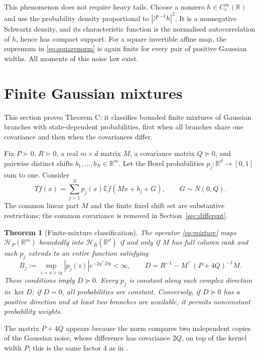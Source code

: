 \documentclass[11pt,a4paper]{article}
\newtheorem{theorem}{Theorem}[section]
\theoremstyle{remark}
\newcommand{\R}{\mathbb R}
\newcommand{\E}{\mathbb E}
\newcommand{\HH}{\mathcal H}
\begin{document}
This phenomenon does not require heavy tails. Choose a nonzero
$h\in C_c^\infty(\R)$ and use the probability density proportional to
$|\mathcal F^{-1}h|^2$. It is a nonnegative Schwartz density, and its
characteristic function is the normalised autocorrelation of $h$, hence
has compact support. For a square invertible affine map, the supremum
in \eqref{eq:squarenorm} is again finite for every pair of positive
Gaussian widths. All moments of this noise law exist.

\section{Finite Gaussian mixtures}\label{sec:mixtures}

This section proves Theorem C: it classifies bounded finite mixtures of
Gaussian branches with state-dependent probabilities, first when all
branches share one covariance and then when the covariances differ.

Fix $P\succ0$, $R\succ0$, a real $m\times d$ matrix $M$,
a covariance matrix $Q\succeq0$, and pairwise distinct shifts
$b_1,\ldots,b_N\in\R^m$. Let the Borel probabilities
$p_j:\R^d\to[0,1]$ sum to one. Consider
\begin{equation}\label{eq:mixture}
 Tf(x)=\sum_{j=1}^Np_j(x)\E f(Mx+b_j+G),\qquad
                         G\sim N(0,Q).
\end{equation}
The common linear part $M$ and the finite fixed shift set are
substantive restrictions; the common covariance is removed in
Section~\ref{sec:different}.

\begin{theorem}[Finite-mixture classification]\label{thm:mixture}
The operator \eqref{eq:mixture} maps $\HH_P(\R^m)$ boundedly
into $\HH_R(\R^d)$ if and only if $M$ has full column rank and
each $p_j$ extends to an entire function satisfying
\begin{equation}\label{eq:weightbound}
 B_j:=\sup_{z=x+iy}|p_j(z)|e^{-2y^\top Dy}<\infty,\qquad
 D=R^{-1}-M^\top(P+4Q)^{-1}M .
\end{equation}
These conditions imply $D\succeq0$. Every $p_j$ is constant
along each complex direction in $\ker D$; if $D=0$, all
probabilities are constant. Conversely, if $D\succeq0$ has a
positive direction and at least two branches are
available, it permits nonconstant probability weights.
\end{theorem}

The matrix $P+4Q$ appears because the norm compares two independent
copies of the Gaussian noise, whose difference has covariance $2Q$, on
top of the kernel width $P$; this is the same factor $4$ as in
\cite{Evidence2026}.
\end{document}
